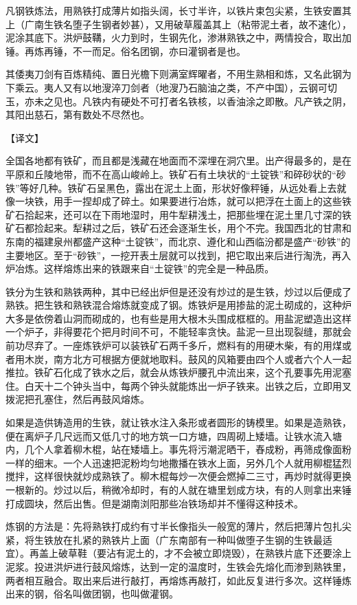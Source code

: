 \documentclass[12pt,UTF8]{ctexbook}
\begin{document}
凡钢铁炼法，用熟铁打成薄片如指头阔，长寸半许，以铁片束包尖紧，生铁安置其上（广南生铁名堕子生钢者妙甚），又用破草履盖其上（粘带泥土者，故不速化），泥涂其底下。洪炉鼓鞲，火力到时，生钢先化，渗淋熟铁之中，两情投合，取出加锤。再炼再锤，不一而足。俗名团钢，亦曰灌钢者是也。

其倭夷刀剑有百炼精纯、置日光檐下则满室辉曜者，不用生熟相和炼，又名此钢为下乘云。夷人又有以地溲淬刀剑者（地溲乃石脑油之类，不产中国），云钢可切玉，亦未之见也。凡铁内有硬处不可打者名铁核，以香油涂之即散。凡产铁之阴，其阳出慈石，第有数处不尽然也。

【译文】

全国各地都有铁矿，而且都是浅藏在地面而不深埋在洞穴里。出产得最多的，是在平原和丘陵地带，而不在高山峻岭上。铁矿石有土块状的“土锭铁”和碎砂状的“砂铁”等好几种。铁矿石呈黑色，露出在泥土上面，形状好像秤锤，从远处看上去就像一块铁，用手一捏却成了碎土。如果要进行冶炼，就可以把浮在土面上的这些铁矿石拾起来，还可以在下雨地湿时，用牛犁耕浅土，把那些埋在泥土里几寸深的铁矿石都捡起来。犁耕过之后，铁矿石还会逐渐生长，用个不完。我国西北的甘肃和东南的福建泉州都盛产这种“土锭铁”，而北京、遵化和山西临汾都是盛产“砂铁”的主要地区。至于“砂铁”，一挖开表土层就可以找到，把它取出来后进行淘洗，再入炉冶炼。这样熔炼出来的铁跟来自“土锭铁”的完全是一种品质。

铁分为生铁和熟铁两种，其中已经出炉但是还没有炒过的是生铁，炒过以后便成了熟铁。把生铁和熟铁混合熔炼就变成了钢。炼铁炉是用掺盐的泥土砌成的，这种炉大多是依傍着山洞而砌成的，也有些是用大根木头围成框框的。用盐泥塑造出这样一个炉子，非得要花个把月时间不可，不能轻率贪快。盐泥一旦出现裂缝，那就会前功尽弃了。一座炼铁炉可以装铁矿石两千多斤，燃料有的用硬木柴，有的用煤或者用木炭，南方北方可根据方便就地取料。鼓风的风箱要由四个人或者六个人一起推拉。铁矿石化成了铁水之后，就会从炼铁炉腰孔中流出来，这个孔要事先用泥塞住。白天十二个钟头当中，每两个钟头就能炼出一炉子铁来。出铁之后，立即用叉拨泥把孔塞住，然后再鼓风熔炼。

如果是造供铸造用的生铁，就让铁水注入条形或者圆形的铸模里。如果是造熟铁，便在离炉子几尺远而又低几寸的地方筑一口方塘，四周砌上矮墙。让铁水流入塘内，几个人拿着柳木棍，站在矮墙上。事先将污潮泥晒干，舂成粉，再筛成像面粉一样的细末。一个人迅速把泥粉均匀地撒播在铁水上面，另外几个人就用柳棍猛烈搅拌，这样很快就炒成熟铁了。柳木棍每炒一次便会燃掉二三寸，再炒时就得更换一根新的。炒过以后，稍微冷却时，有的人就在塘里划成方块，有的人则拿出来锤打成圆块，然后出售。但是湖南浏阳那些冶铁场却并不懂得这种技术。

炼钢的方法是：先将熟铁打成约有寸半长像指头一般宽的薄片，然后把薄片包扎尖紧，将生铁放在扎紧的熟铁片上面（广东南部有一种叫做堕子生钢的生铁最适宜）。再盖上破草鞋（要沾有泥土的，才不会被立即烧毁），在熟铁片底下还要涂上泥浆。投进洪炉进行鼓风熔炼，达到一定的温度时，生铁会先熔化而渗到熟铁里，两者相互融合。取出来后进行敲打，再熔炼再敲打，如此反复进行多次。这样锤炼出来的钢，俗名叫做团钢，也叫做灌钢。
\end{document}
